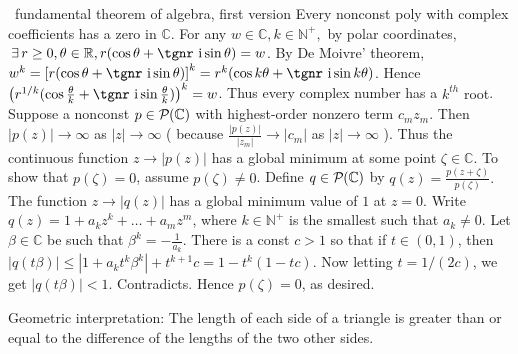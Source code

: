 \documentclass[a4paper, 11pt, UTF8]{article}
\def\i{{\textup{\tgnr i}}}
\def\Rbb{{\mathbb{R}}}
\def\Cbb{{\mathbb{C}}}
\def\Nbp{{\mathbb{N}^+}}
\def\BulletPoint{{\small\bullet}}
\begin{document}
\begin{large}
\BulletPoint \,\hspace{1pt}\NoteFor{[4.13]} {\tgsl fundamental theorem of algebra, first version}\TextB{}
{\tgsl Every nonconst poly with complex coefficients has a zero in $\Cbb$.} 
For any $w\in\Cbb,k\in\Nbp,$ by polar coordinates, $\,\exists\,r\geq 0,\theta\in\Rbb,r(\cos\theta + \i \sin\theta) = w$.\TextB{}
By De Moivre' theorem, $w^k=\left[r(\cos\theta +\i\sin \theta)\right]^k=r^k(\cos k\theta + \i \sin k\theta)$.\TextB{}
Hence $\left(r^{1/k}(\cos\frac{\theta}{k} +\i\sin\frac{\theta}{k})\right)^k=w$. Thus every complex number has a {\tgsl $k^{th}$ root}.\vspace{5pt}\TextB{}
Suppose a nonconst $p\in\PoC{}$ with highest-order nonzero term $c_m z_m$.\TextB{}
Then $\left|p(z)\right|\rightarrow\infty$ as $\left|z\right|\rightarrow\infty$ ( because $\displaystyle\frac{\left|p(z)\right|}{\left|z_m\right|}\rightarrow\left|c_m\right|$ as $\left|z\right|\rightarrow\infty$ ).\TextB{}
\vspace{3pt}Thus the continuous function $z\rightarrow\left|p(z)\right|$ has a global minimum at some point $\zeta\in\Cbb.$\TextB{}
\vspace{3pt}To show that $p(\zeta) = 0$, assume $p(\zeta)\neq 0$. Define $q\in\PoC{}$ by $q(z)=\displaystyle\frac{p(z+\zeta)}{p(\zeta)}.$\TextB{}
The function $z\rightarrow\left|q(z)\right|$ has a global minimum value of $1$ at $z = 0$.\TextB{}
Write $q(z) = 1 + a_k z^k + \dots + a_m z^m$, where $k\in\Nbp$ is the smallest such that $a_k\neq 0$.\TextB{}
Let $\beta\in\Cbb$ be such that $\displaystyle\beta^k=-\frac{1}{a_k}$.\TextB{}
There is a const $c > 1$ so that if
$t\in (0, 1)$, then $\left|q(t\beta)\right|\leq\left|1 + a_k t^k\beta^k\right|+t^{k+1}c = 1 - t^k (1 - tc)$.\TextB{}
Now letting $t=1/(2c)$, we get $\left|q(t\beta)\right| < 1$. Contradicts. Hence $p(\zeta) = 0$, as desired.\PfEnd
\SepLine\par

\ProblemB{
	\TextB{Prove that if $w,z\in\Cbb,$ then $\left||w|-|z|\right|\leq\left|w-z\right|$.}
}\vspace{-8pt}\PfEnd
{\tgsl\footnotesize Geometric interpretation: The length of each side of a triangle is greater than or equal to the difference of the lengths of the two other sides.}\par
\SepLine\par


\end{large}
\end{document}
